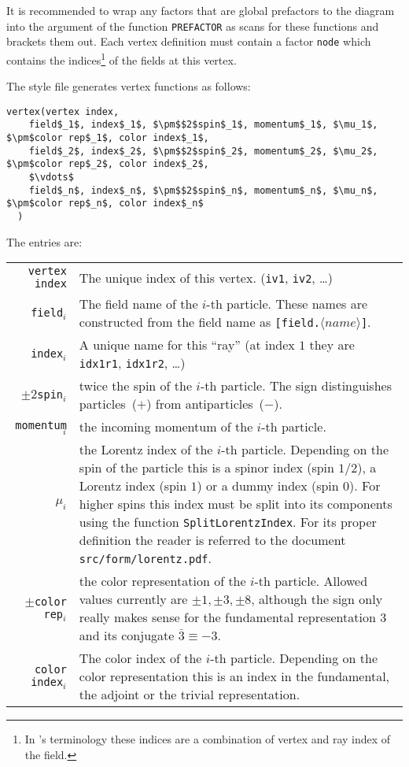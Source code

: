 It is recommended to wrap any factors that are global prefactors to the diagram
into the argument of the function \texttt{PREFACTOR} as \gosamv{} scans for these
functions and brackets them out. Each vertex definition must contain a factor
\texttt{node} which contains the indices\footnote{In \qgraf's terminology
these indices are a combination of vertex and ray index of the field.}
of the fields at this vertex. \newpage

The \qgraf{} style file generates vertex functions as follows:

\begin{lstlisting}[style=form, mathescape]
vertex(vertex index,
    field$_1$, index$_1$, $\pm$$2$spin$_1$, momentum$_1$, $\mu_1$, $\pm$color rep$_1$, color index$_1$,
    field$_2$, index$_2$, $\pm$$2$spin$_2$, momentum$_2$, $\mu_2$, $\pm$color rep$_2$, color index$_2$,
    $\vdots$
    field$_n$, index$_n$, $\pm$$2$spin$_n$, momentum$_n$, $\mu_n$, $\pm$color rep$_n$, color index$_n$
  )
\end{lstlisting}

The entries are:
\begin{longtable}{r p{}}
\texttt{vertex index} & The unique index of this vertex. (\texttt{iv1}, \texttt{iv2}, \dots) \\
\texttt{field}$_i$ & The field name of the $i$-th particle. These names are constructed from the \qgraf{} field name as \texttt{[field.$\langle name\rangle$]}. \\
\texttt{index}$_i$ & A unique name for this ``ray'' (at index $1$ they are \texttt{idx1r1}, \texttt{idx1r2}, \ldots) \\
$\pm2$\texttt{spin}$_i$ & twice the spin of the $i$-th particle.
   The sign distinguishes particles~($+$) from antiparticles~($-$). \\
\texttt{momentum}$_i$ & the incoming momentum of the $i$-th particle. \\
$\mu_i$ & the Lorentz index of the $i$-th particle. Depending on the spin of the particle
   this is a spinor index (spin $1/2$), a Lorentz index (spin $1$) or a dummy index (spin $0$).
   For higher spins this index must be split into its components using the function
   \texttt{SplitLorentzIndex}. For its proper definition the reader is referred to
   the document \texttt{src/form/lorentz.pdf}. \\
$\pm$\texttt{color rep}$_i$ & the color representation of the $i$-th particle. Allowed
   values currently are $\pm1,\pm3,\pm8$, although the sign only really makes sense for the
   fundamental representation $3$ and its conjugate $\bar{3}\equiv-3$. \\
\texttt{color index}$_i$ & The color index of the $i$-th particle. Depending on the color
   representation this is an index in the fundamental, the adjoint or the trivial representation.
\end{longtable}

